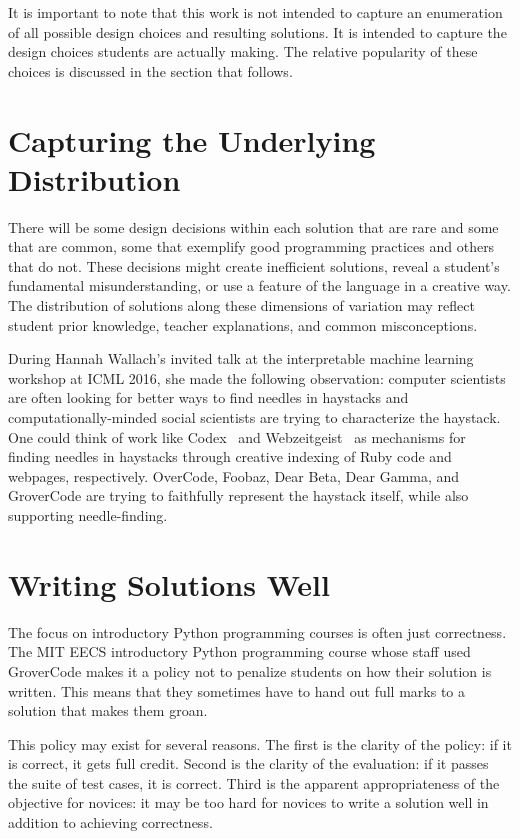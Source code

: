 It is important to note that this work is not intended to capture an enumeration of all possible design choices and resulting solutions. It is intended to capture the design choices students are actually making. The relative popularity of these choices is discussed in the section that follows.

\section{Capturing the Underlying Distribution}

There will be some design decisions within each solution that are rare and some that are common, some that exemplify good programming practices and others that do not. These decisions might create inefficient solutions, reveal a student's fundamental misunderstanding, or use a feature of the language in a creative way. The distribution of solutions along these dimensions of variation may reflect student prior knowledge, teacher explanations, and common misconceptions. 

During Hannah Wallach's invited talk at the interpretable machine learning workshop at ICML 2016, she made the following observation: computer scientists are often looking for better ways to find needles in haystacks and computationally-minded social scientists are trying to characterize the haystack. One could think of work like Codex~\cite{codex} and Webzeitgeist~\cite{webzeitgeist} as mechanisms for finding needles in haystacks through creative indexing of Ruby code and webpages, respectively. OverCode, Foobaz, Dear Beta, Dear Gamma, and GroverCode are trying to faithfully represent the haystack itself, while also supporting needle-finding. 

\section{Writing Solutions Well}

The focus on introductory Python programming courses is often just correctness. The MIT EECS introductory Python programming course whose staff used GroverCode makes it a policy not to penalize students on how their solution is written. This means that they sometimes have to hand out full marks to a solution that makes them groan.

This policy may exist for several reasons. The first is the clarity of the policy: if it is correct, it gets full credit. Second is the clarity of the evaluation: if it passes the suite of test cases, it is correct. Third is the apparent appropriateness of the objective for novices: it may be too hard for novices to write a solution well in addition to achieving correctness. %

